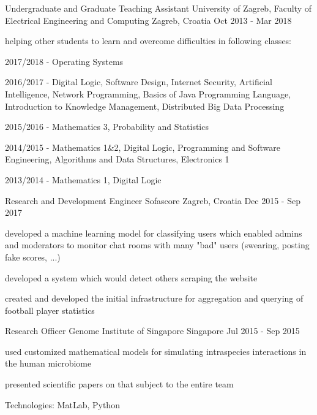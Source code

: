 \begin{cventries}
  \cventry
    {Undergraduate and Graduate Teaching Assistant} %
    {University of Zagreb, Faculty of Electrical Engineering and Computing} %
    {Zagreb, Croatia} %
    {Oct 2013 - Mar 2018} %
    {
      \begin{cvitems} %
        \item {helping other students to learn and overcome difficulties in following classes:}
        \item {2017/2018 - Operating Systems}
        \item {2016/2017 - Digital Logic, Software Design, Internet Security, Artificial Intelligence, Network Programming, Basics of Java Programming Language, Introduction to Knowledge Management, Distributed Big Data Processing}
        \item {2015/2016 - Mathematics 3, Probability and Statistics}
        \item {2014/2015 - Mathematics 1\&2, Digital Logic, Programming and Software Engineering, Algorithms and Data Structures, Electronics 1}
        \item {2013/2014 - Mathematics 1, Digital Logic}
      \end{cvitems}
    }

  \cventry
    {Research and Development Engineer} %
    {Sofascore} %
    {Zagreb, Croatia} %
    {Dec 2015 - Sep 2017} %
    {
      \begin{cvitems} %
        \item {developed a machine learning model for classifying users which enabled admins and moderators to monitor chat rooms with many "bad" users (swearing, posting fake scores, ...)}
        \item {developed a system which would detect others scraping the website}
        \item {created and developed the initial infrastructure for aggregation and querying of football player statistics}
      \end{cvitems}
    }

  \cventry
    {Research Officer} %
    {Genome Institute of Singapore} %
    {Singapore} %
    {Jul 2015 - Sep 2015} %
    {
      \begin{cvitems} %
        \item {used customized mathematical models for simulating intraspecies interactions in the human microbiome}
        \item {presented scientific papers on that subject to the entire team}
        \item {Technologies: MatLab, Python}
      \end{cvitems}
    }

\end{cventries}
